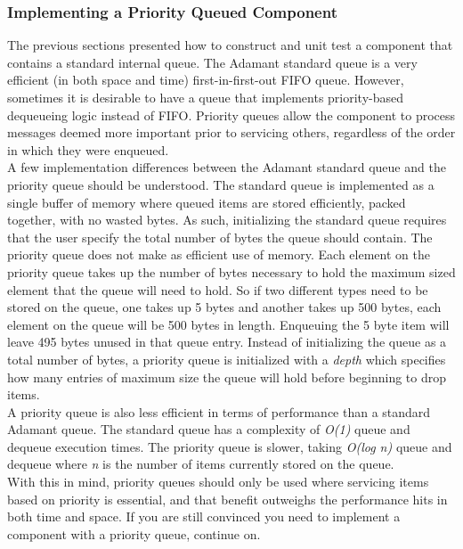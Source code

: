 \subsubsection{Implementing a Priority Queued Component} \label{Implementing a Priority Queued Component}

The previous sections presented how to construct and unit test a component that contains a standard internal queue. The Adamant standard queue is a very efficient (in both space and time) first-in-first-out FIFO queue. However, sometimes it is desirable to have a queue that implements priority-based dequeueing logic instead of FIFO. Priority queues allow the component to process messages deemed more important prior to servicing others, regardless of the order in which they were enqueued. \\

A few implementation differences between the Adamant standard queue and the priority queue should be understood. The standard queue is implemented as a single buffer of memory where queued items are stored efficiently, packed together, with no wasted bytes. As such, initializing the standard queue requires that the user specify the total number of bytes the queue should contain. The priority queue does not make as efficient use of memory. Each element on the priority queue takes up the number of bytes necessary to hold the maximum sized element that the queue will need to hold. So if two different types need to be stored on the queue, one takes up 5 bytes and another takes up 500 bytes, each element on the queue will be 500 bytes in length. Enqueuing the 5 byte item will leave 495 bytes unused in that queue entry. Instead of initializing the queue as a total number of bytes, a priority queue is initialized with a \textit{depth} which specifies how many entries of maximum size the queue will hold before beginning to drop items. \\

A priority queue is also less efficient in terms of performance than a standard Adamant queue. The standard queue has a complexity of \textit{O(1)} queue and dequeue execution times. The priority queue is slower, taking \textit{O(log n)} queue and dequeue where \textit{n} is the number of items currently stored on the queue. \\

With this in mind, priority queues should only be used where servicing items based on priority is essential, and that benefit outweighs the performance hits in both time and space. If you are still convinced you need to implement a component with a priority queue, continue on. \\


